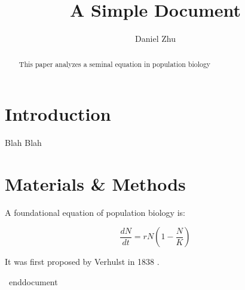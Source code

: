 \documentclass[12pt]{article}
\title{A Simple Document}
\author{Daniel Zhu}
\date{}
\begin{document}
  \maketitle

  \begin{abstract}
    This paper analyzes a seminal equation in population biology
  \end{abstract}

  \section{Introduction}
    Blah Blah

  \section{Materials \& Methods}

  A foundational equation of population biology is:

  \begin{equation}
    \frac{dN}{dt} = r N (1 - \frac{N}{K})
  \end{equation}

  It was first proposed by Verhulst in 1838 \cite {verhulst1838notice}.

  

  

\ end{document}
\end{document}
